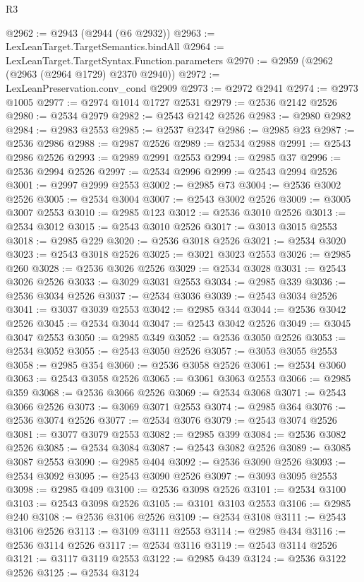 \begin{lexlean}{R3}
\begin{coremodule}
@2962 := @2943 (@2944 (@6 @2932))
@2963 := LexLeanTarget.TargetSemantics.bindAll
@2964 := LexLeanTarget.TargetSyntax.Function.parameters
@2970 := @2959 (@2962 (@2963 (@2964 @1729) @2370 @2940))
@2972 := LexLeanPreservation.conv_cond @2909
@2973 := @2972 @2941
@2974 := @2973 @1005
@2977 := @2974 @1014 @1727 @2531
@2979 := @2536 @2142 @2526
@2980 := @2534 @2979
@2982 := @2543 @2142 @2526
@2983 := @2980 @2982
@2984 := @2983 @2553
@2985 := @2537 @2347
@2986 := @2985 @23
@2987 := @2536 @2986
@2988 := @2987 @2526
@2989 := @2534 @2988
@2991 := @2543 @2986 @2526
@2993 := @2989 @2991 @2553
@2994 := @2985 @37
@2996 := @2536 @2994 @2526
@2997 := @2534 @2996
@2999 := @2543 @2994 @2526
@3001 := @2997 @2999 @2553
@3002 := @2985 @73
@3004 := @2536 @3002 @2526
@3005 := @2534 @3004
@3007 := @2543 @3002 @2526
@3009 := @3005 @3007 @2553
@3010 := @2985 @123
@3012 := @2536 @3010 @2526
@3013 := @2534 @3012
@3015 := @2543 @3010 @2526
@3017 := @3013 @3015 @2553
@3018 := @2985 @229
@3020 := @2536 @3018 @2526
@3021 := @2534 @3020
@3023 := @2543 @3018 @2526
@3025 := @3021 @3023 @2553
@3026 := @2985 @260
@3028 := @2536 @3026 @2526
@3029 := @2534 @3028
@3031 := @2543 @3026 @2526
@3033 := @3029 @3031 @2553
@3034 := @2985 @339
@3036 := @2536 @3034 @2526
@3037 := @2534 @3036
@3039 := @2543 @3034 @2526
@3041 := @3037 @3039 @2553
@3042 := @2985 @344
@3044 := @2536 @3042 @2526
@3045 := @2534 @3044
@3047 := @2543 @3042 @2526
@3049 := @3045 @3047 @2553
@3050 := @2985 @349
@3052 := @2536 @3050 @2526
@3053 := @2534 @3052
@3055 := @2543 @3050 @2526
@3057 := @3053 @3055 @2553
@3058 := @2985 @354
@3060 := @2536 @3058 @2526
@3061 := @2534 @3060
@3063 := @2543 @3058 @2526
@3065 := @3061 @3063 @2553
@3066 := @2985 @359
@3068 := @2536 @3066 @2526
@3069 := @2534 @3068
@3071 := @2543 @3066 @2526
@3073 := @3069 @3071 @2553
@3074 := @2985 @364
@3076 := @2536 @3074 @2526
@3077 := @2534 @3076
@3079 := @2543 @3074 @2526
@3081 := @3077 @3079 @2553
@3082 := @2985 @399
@3084 := @2536 @3082 @2526
@3085 := @2534 @3084
@3087 := @2543 @3082 @2526
@3089 := @3085 @3087 @2553
@3090 := @2985 @404
@3092 := @2536 @3090 @2526
@3093 := @2534 @3092
@3095 := @2543 @3090 @2526
@3097 := @3093 @3095 @2553
@3098 := @2985 @409
@3100 := @2536 @3098 @2526
@3101 := @2534 @3100
@3103 := @2543 @3098 @2526
@3105 := @3101 @3103 @2553
@3106 := @2985 @240
@3108 := @2536 @3106 @2526
@3109 := @2534 @3108
@3111 := @2543 @3106 @2526
@3113 := @3109 @3111 @2553
@3114 := @2985 @434
@3116 := @2536 @3114 @2526
@3117 := @2534 @3116
@3119 := @2543 @3114 @2526
@3121 := @3117 @3119 @2553
@3122 := @2985 @439
@3124 := @2536 @3122 @2526
@3125 := @2534 @3124

\end{coremodule}
\end{lexlean}
